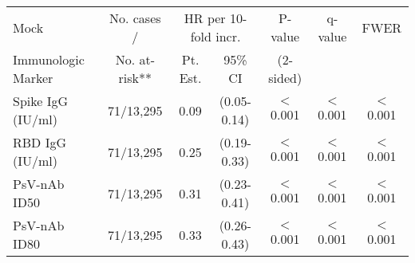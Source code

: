 \begin{tabular}{lcccccc}
   \hline
 
         \multicolumn{1}{l}{Mock} & \multicolumn{1}{c}{No. cases /}   & \multicolumn{2}{c}{HR per 10-fold incr.}                     & \multicolumn{1}{c}{P-value}   & \multicolumn{1}{c}{q-value}   & \multicolumn{1}{c}{FWER} \\ 
         \multicolumn{1}{l}{Immunologic Marker}            & \multicolumn{1}{c}{No. at-risk**} & \multicolumn{1}{c}{Pt. Est.} & \multicolumn{1}{c}{95\% CI} & \multicolumn{1}{c}{(2-sided)} & \multicolumn{1}{c}{} & \multicolumn{1}{c}{} \\ 
         \hline
 
    Spike IgG (IU/ml) & 71/13,295 & 0.09 & (0.05-0.14) & $<$0.001 & $<$0.001 & $<$0.001 \\ 
  RBD IgG (IU/ml) & 71/13,295 & 0.25 & (0.19-0.33) & $<$0.001 & $<$0.001 & $<$0.001 \\ 
  PsV-nAb ID50 & 71/13,295 & 0.31 & (0.23-0.41) & $<$0.001 & $<$0.001 & $<$0.001 \\ 
  PsV-nAb ID80 & 71/13,295 & 0.33 & (0.26-0.43) & $<$0.001 & $<$0.001 & $<$0.001 \\ 
   \hline
\end{tabular}
